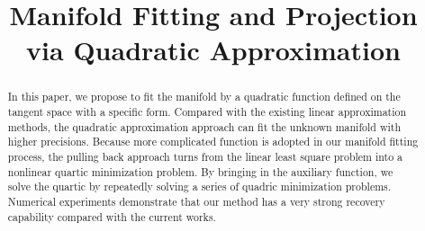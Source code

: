 \documentclass[aos,preprint]{imsart}
\theoremstyle{remark}
\begin{document}
\begin{frontmatter}
\title{Manifold Fitting and Projection via Quadratic Approximation}

\begin{abstract}
In this paper, we propose to fit the manifold by a quadratic function defined on the tangent space with a specific form. Compared with the existing linear approximation methods, the quadratic approximation approach can fit the unknown manifold with higher precisions. Because more complicated function is adopted in our manifold fitting process, the pulling back approach turns from the linear least square problem into a nonlinear quartic minimization problem. By bringing in the auxiliary function, we solve the quartic by repeatedly solving a series of quadric minimization problems. Numerical experiments demonstrate that our method has a very strong recovery capability compared with the current works.
\end{abstract}


\end{frontmatter}
\end{document}
